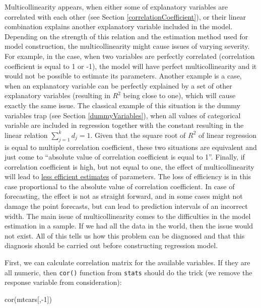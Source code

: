 \documentclass[
]{book}
\newenvironment{Shaded}{\begin{snugshade}}{\end{snugshade}}
\newcommand{\DecValTok}[1]{\textcolor[rgb]{0.00,0.00,0.81}{#1}}
\newcommand{\FunctionTok}[1]{\textcolor[rgb]{0.00,0.00,0.00}{#1}}
\newcommand{\NormalTok}[1]{#1}
\newcommand{\SpecialCharTok}[1]{\textcolor[rgb]{0.00,0.00,0.00}{#1}}
\theoremstyle{definition}
\theoremstyle{definition}
\theoremstyle{definition}
\theoremstyle{definition}
\theoremstyle{remark}
\begin{document}
Multicollinearity appears, when either some of explanatory variables are correlated with each other (see Section \ref{correlationCoefficient}), or their linear combination explains another explanatory variable included in the model. Depending on the strength of this relation and the estimation method used for model construction, the multicollinearity might cause issues of varying severity. For example, in the case, when two variables are perfectly correlated (correlation coefficient is equal to 1 or -1), the model will have perfect multicollinearity and it would not be possible to estimate its parameters. Another example is a case, when an explanatory variable can be perfectly explained by a set of other explanatory variables (resulting in \(R^2\) being close to one), which will cause exactly the same issue. The classical example of this situation is the dummy variables trap (see Section \ref{dummyVariables}), when all values of categorical variable are included in regression together with the constant resulting in the linear relation \(\sum_{j=1}^k d_j = 1\). Given that the square root of \(R^2\) of linear regression is equal to multiple correlation coefficient, these two situations are equivalent and just come to ``absolute value of correlation coefficient is equal to 1''. Finally, if correlation coefficient is high, but not equal to one, the effect of multicollinearity will lead to \protect\hyperlink{estimatesPropertiesEfficiency}{less efficient estimates} of parameters. The loss of efficiency is in this case proportional to the absolute value of correlation coefficient. In case of forecasting, the effect is not as straight forward, and in some cases might not damage the point forecasts, but can lead to prediction intervals of an incorrect width. The main issue of multicollinearity comes to the difficulties in the model estimation in a sample. If we had all the data in the world, then the issue would not exist. All of this tells us how this problem can be diagnosed and that this diagnosis should be carried out before constructing regression model.

First, we can calculate correlation matrix for the available variables. If they are all numeric, then \texttt{cor()} function from \texttt{stats} should do the trick (we remove the response variable from consideration):

\begin{Shaded}
\begin{Highlighting}[]
\FunctionTok{cor}\NormalTok{(mtcars[,}\SpecialCharTok{{-}}\DecValTok{1}\NormalTok{])}
\end{Highlighting}
\end{Shaded}
\end{document}
